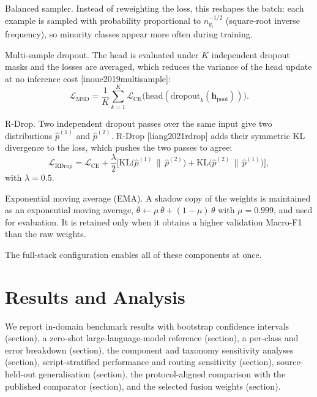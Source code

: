 \documentclass[11pt,a4paper]{article}
\def\citep#1{[#1]}%
\def\cref#1{section}%
\def\emph#1{#1}%
\begin{document}
\emph{Balanced sampler.} Instead of reweighting the loss, this reshapes the batch: each example is sampled with probability proportional to $n_{y_i}^{-1/2}$ (square-root inverse frequency), so minority classes appear more often during training.

\emph{Multi-sample dropout.} The head is evaluated under $K$ independent dropout masks and the losses are averaged, which reduces the variance of the head update at no inference cost \citep{inoue2019multisample}:
\begin{equation}
\mathcal{L}_{\mathrm{MSD}} = \frac{1}{K}\sum_{k=1}^{K} \mathcal{L}_{\mathrm{CE}}\!\big(\mathrm{head}(\mathrm{dropout}_k(\mathbf{h}_{\mathrm{pool}}))\big).
\label{eq:msd}
\end{equation}

\emph{R-Drop.} Two independent dropout passes over the same input give two distributions $\hat{p}^{(1)}$ and $\hat{p}^{(2)}$. R-Drop \citep{liang2021rdrop} adds their symmetric KL divergence to the loss, which pushes the two passes to agree:
\begin{equation}
\mathcal{L}_{\mathrm{RDrop}} = \mathcal{L}_{\mathrm{CE}} + \frac{\lambda}{2}\Big[\mathrm{KL}\big(\hat{p}^{(1)} \,\|\, \hat{p}^{(2)}\big) + \mathrm{KL}\big(\hat{p}^{(2)} \,\|\, \hat{p}^{(1)}\big)\Big],
\label{eq:rdrop}
\end{equation}
with $\lambda = 0.5$.

\emph{Exponential moving average (EMA).} A shadow copy of the weights is maintained as an exponential moving average, $\bar{\theta} \leftarrow \mu\,\bar{\theta} + (1-\mu)\,\theta$ with $\mu = 0.999$, and used for evaluation. It is retained only when it obtains a higher validation Macro-F1 than the raw weights.

The full-stack configuration enables all of these components at once.


\section{Results and Analysis}
\label{sec:results}

We report in-domain benchmark results with bootstrap confidence intervals (\cref{sec:main-results}), a zero-shot large-language-model reference (\cref{sec:llm-baseline}), a per-class and error breakdown (\cref{sec:perclass-results}), the component and taxonomy sensitivity analyses (\cref{sec:ablation-results}), script-stratified performance and routing sensitivity (\cref{sec:scriptmask-results}), source-held-out generalisation (\cref{sec:robustness-results}), the protocol-aligned comparison with the published comparator (\cref{sec:basepaper-results}), and the selected fusion weights (\cref{sec:ensemble-results}).
\end{document}
